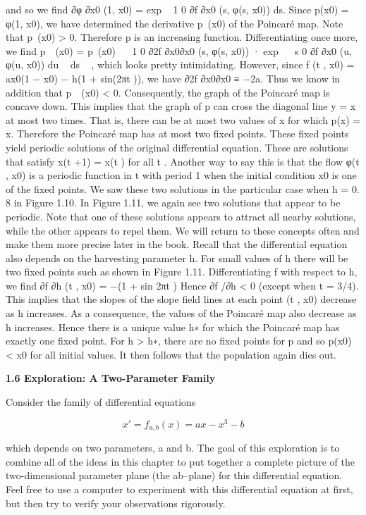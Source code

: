\documentclass{article}
\begin{document}
and so we find
∂φ
∂x0
(1, x0) = exp
  1
0
∂f
∂x0
(s, φ(s, x0)) ds.
Since p(x0) = φ(1, x0), we have determined the derivative p (x0) of the
Poincaré map. Note that p (x0) > 0. Therefore p is an increasing function.
Differentiating once more, we find
p  (x0) = p (x0)
   1
0
∂2f
∂x0∂x0
(s, φ(s, x0)) · exp
   s
0
∂f
∂x0
(u, φ(u, x0)) du
 
ds
 
,
which looks pretty intimidating. However, since
f (t , x0) = ax0(1 − x0) − h(1 + sin(2πt )),
we have
∂2f
∂x0∂x0
≡ −2a.
Thus we know in addition that p  (x0) < 0. Consequently, the graph of the
Poincaré map is concave down. This implies that the graph of p can cross the
diagonal line y = x at most two times. That is, there can be at most two values
of x for which p(x) = x. Therefore the Poincaré map has at most two fixed
points. These fixed points yield periodic solutions of the original differential
equation. These are solutions that satisfy x(t +1) = x(t ) for all t . Another way
to say this is that the flow φ(t , x0) is a periodic function in t with period 1 when
the initial condition x0 is one of the fixed points. We saw these two solutions
in the particular case when h = 0. 8 in Figure 1.10. In Figure 1.11, we again
see two solutions that appear to be periodic. Note that one of these solutions
appears to attract all nearby solutions, while the other appears to repel them.
We will return to these concepts often and make them more precise later in
the book.
Recall that the differential equation also depends on the harvesting parameter
h. For small values of h there will be two fixed points such as shown in
Figure 1.11. Differentiating f with respect to h, we find
∂f
∂h
(t , x0) = −(1 + sin 2πt )
Hence ∂f /∂h < 0 (except when t = 3/4). This implies that the slopes of the
slope field lines at each point (t , x0) decrease as h increases. As a consequence,
the values of the Poincaré map also decrease as h increases. Hence there is a
unique value h∗ for which the Poincaré map has exactly one fixed point. For
h > h∗, there are no fixed points for p and so p(x0) < x0 for all initial values.
It then follows that the population again dies out.

\hfill

\textbf{1.6 Exploration: A Two-Parameter
Family}

\hfill

Consider the family of differential equations

\[
x' = f_{a,b}(x) = ax − x^3 − b
\]

which depends on two parameters, a and b. The goal of this exploration is
to combine all of the ideas in this chapter to put together a complete picture
of the two-dimensional parameter plane (the ab–plane) for this differential
equation. Feel free to use a computer to experiment with this differential
equation at first, but then try to verify your observations rigorously.
\end{document}
